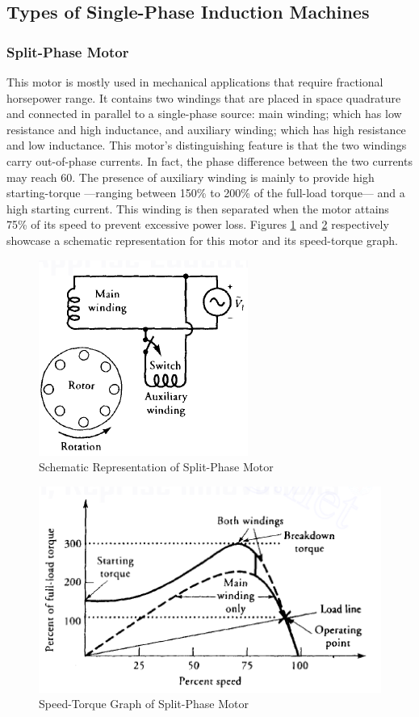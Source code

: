 \documentclass[journal]{IEEEtran}
\begin{document}
\subsection{Types of Single-Phase Induction Machines}
\subsubsection{Split-Phase Motor}
This motor is mostly used in mechanical applications that require fractional horsepower range. It contains two windings that are placed in space quadrature and connected in parallel to a single-phase source: main winding; which has low resistance and high inductance, and auxiliary winding; which has high resistance and low inductance. This motor's distinguishing feature is that the two windings carry out-of-phase currents. In fact, the phase difference between the two currents may reach 60\textdegree. The presence of auxiliary winding is mainly to provide high starting-torque —ranging between 150\% to 200\% of the full-load torque— and a high starting current. This winding is then separated when the motor attains 75\% of its speed to prevent excessive power loss\cite{guru2007}. Figures \ref{fig:splitphasesch} and \ref{fig:splitphasegraph} respectively showcase a schematic representation for this motor and its speed-torque graph.
\begin{figure}[h]
    \centering
    \includegraphics[scale=0.60]{Induction/split_phase_sch.PNG}
    \caption{Schematic Representation of Split-Phase Motor \cite{guru2007}}
    \label{fig:splitphasesch}
\end{figure}
\begin{figure}[h]
    \centering
    \includegraphics[scale=0.55]{Induction/split_phase_graph.PNG}
    \caption{Speed-Torque Graph of Split-Phase Motor \cite{guru2007}}
    \label{fig:splitphasegraph}
\end{figure}
\end{document}
